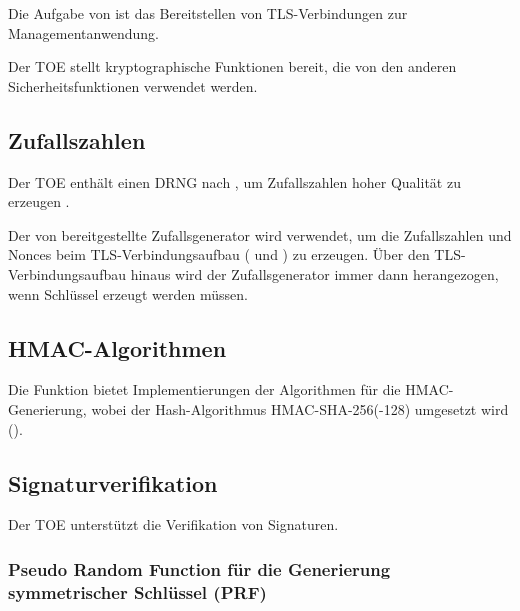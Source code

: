 %



Die Aufgabe von  ist das
Bereitstellen von TLS-Verbindungen zur Managementanwendung.

\sfdescription{}

Der TOE stellt kryptographische Funktionen bereit, die von den anderen
Sicherheitsfunktionen verwendet werden.

\subsection{Zufallszahlen}%
\label{sf.cryptographicservices.rng}

Der TOE enthält einen DRNG nach , um
Zufallszahlen hoher Qualität zu erzeugen \autocite{SP80090A}.

Der von  bereitgestellte Zufallsgenerator wird
verwendet, um die Zufallszahlen und Nonces beim TLS-Verbindungsaufbau
( und ) zu erzeugen. Über den
TLS-Verbindungsaufbau hinaus wird der Zufallsgenerator immer dann herangezogen,
wenn Schlüssel erzeugt werden müssen.

\subsection{HMAC-Algorithmen}%
\label{sf.cryptographicservices.hmac}

Die Funktion bietet Implementierungen der Algorithmen für die
HMAC-Generierung, wobei der Hash-Algorithmus
HMAC-SHA-256(-128) umgesetzt wird ().

\subsection{Signaturverifikation}%
\label{sf.cryptographicservices.sigver}

Der TOE unterstützt die Verifikation von Signaturen.


\subsubsection{Pseudo Random Function für die Generierung
  symmetrischer Schlüssel (PRF)}%
\label{sf.cryptographicservices.ipsec.prf}

